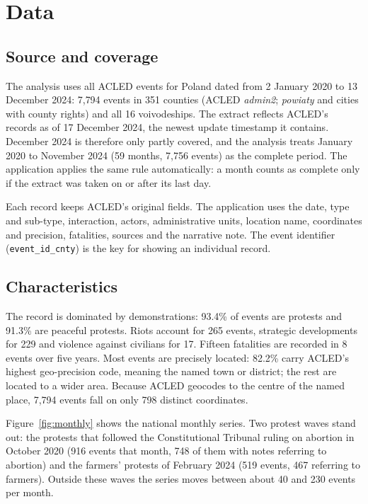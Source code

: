 \documentclass[11pt,a4paper]{article}
\begin{document}
\section{Data}
\label{sec:data}

\subsection{Source and coverage}

The analysis uses all ACLED events for Poland dated from 2 January 2020 to 13 December 2024: 7{,}794 events in 351 counties (ACLED \emph{admin2}; \emph{powiaty} and cities with county rights) and all 16 voivodeships. The extract reflects ACLED's records as of 17 December 2024, the newest update timestamp it contains. December 2024 is therefore only partly covered, and the analysis treats January 2020 to November 2024 (59 months, 7{,}756 events) as the complete period. The application applies the same rule automatically: a month counts as complete only if the extract was taken on or after its last day.

Each record keeps ACLED's original fields. The application uses the date, type and sub-type, interaction, actors, administrative units, location name, coordinates and precision, fatalities, sources and the narrative note. The event identifier (\texttt{event\_id\_cnty}) is the key for showing an individual record.

\subsection{Characteristics}

The record is dominated by demonstrations: 93.4\% of events are protests and 91.3\% are peaceful protests. Riots account for 265 events, strategic developments for 229 and violence against civilians for 17. Fifteen fatalities are recorded in 8 events over five years. Most events are precisely located: 82.2\% carry ACLED's highest geo-precision code, meaning the named town or district; the rest are located to a wider area. Because ACLED geocodes to the centre of the named place, 7{,}794 events fall on only 798 distinct coordinates.

Figure~\ref{fig:monthly} shows the national monthly series. Two protest waves stand out: the protests that followed the Constitutional Tribunal ruling on abortion in October 2020 (916 events that month, 748 of them with notes referring to abortion) and the farmers' protests of February 2024 (519 events, 467 referring to farmers). Outside these waves the series moves between about 40 and 230 events per month.
\end{document}
